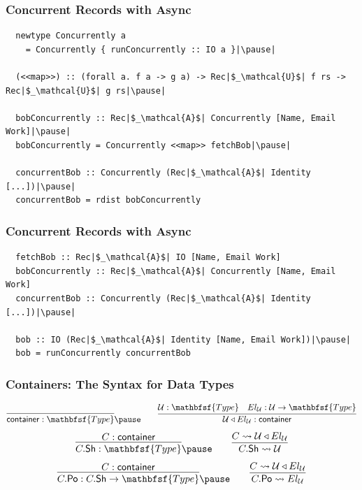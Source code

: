 \documentclass[12pt]{beamer}
\def\Type{\mathbfsf{Type}}
\begin{document}
\begin{frame}[fragile]
  \frametitle{Concurrent Records with Async}\pause

  \begin{lstlisting}
  newtype Concurrently a
    = Concurrently { runConcurrently :: IO a }|\pause|

  (<<map>>) :: (forall a. f a -> g a) -> Rec|$_\mathcal{U}$| f rs -> Rec|$_\mathcal{U}$| g rs|\pause|

  bobConcurrently :: Rec|$_\mathcal{A}$| Concurrently [Name, Email Work]|\pause|
  bobConcurrently = Concurrently <<map>> fetchBob|\pause|

  concurrentBob :: Concurrently (Rec|$_\mathcal{A}$| Identity [...])|\pause|
  concurrentBob = rdist bobConcurrently
  \end{lstlisting}
\end{frame}

\begin{frame}[fragile]
  \frametitle{Concurrent Records with Async}\pause

  \begin{lstlisting}
  fetchBob :: Rec|$_\mathcal{A}$| IO [Name, Email Work]
  bobConcurrently :: Rec|$_\mathcal{A}$| Concurrently [Name, Email Work]
  concurrentBob :: Concurrently (Rec|$_\mathcal{A}$| Identity [...])|\pause|

  bob :: IO (Rec|$_\mathcal{A}$| Identity [Name, Email Work])|\pause|
  bob = runConcurrently concurrentBob
  \end{lstlisting}
\end{frame}

\def\container{\mathsf{container}}
\newcommand\mkcon[2]{#1\triangleleft#2}

\begin{frame}
  \frametitle{Containers: The Syntax for Data Types}

  \[
    \infer{\container : \Type}{}\pause
    \qquad
    \infer{\mkcon{\mathcal{U}}{El_\mathcal{U}} : \container}{
      \mathcal{U} : \Type &
      El_\mathcal{U} : \mathcal{U} \to \Type
    }
  \]\pause
  \[
    \infer{C.\mathsf{Sh} : \Type}{C : \container}\pause
    \qquad
    \infer{C.\mathsf{Sh} \leadsto \mathcal{U}}{C \leadsto \mkcon{\mathcal{U}}{El_\mathcal{U}}}
  \]\pause
  \[
    \infer{C.\mathsf{Po} : C.\mathsf{Sh} \to \Type}{C : \container}\pause
    \qquad
    \infer{C.\mathsf{Po} \leadsto El_\mathcal{U}}{C \leadsto \mkcon{\mathcal{U}}{El_\mathcal{U}}}
  \]
\end{frame}
\end{document}
